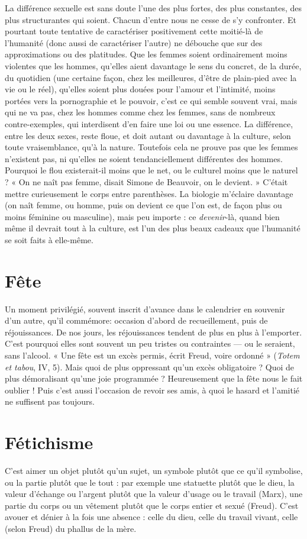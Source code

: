 La différence sexuelle est sans doute l’une des plus fortes, des plus constantes,
des plus structurantes qui soient. Chacun d’entre nous ne cesse de s’y
confronter. Et pourtant toute tentative de caractériser positivement cette
moitié-là de l’humanité (donc aussi de caractériser l’autre) ne débouche que sur
des approximations ou des platitudes. Que les femmes soient ordinairement
moins violentes que les hommes, qu’elles aient davantage le sens du concret, de
la durée, du quotidien (une certaine façon, chez les meilleures, d’être de plain-pied
avec la vie ou le réel), qu’elles soient plus douées pour l’amour et l’intimité,
moins portées vers la pornographie et le pouvoir, c’est ce qui semble souvent
vrai, mais qui ne va pas, chez les hommes comme chez les femmes, sans de
nombreux contre-exemples, qui interdisent d’en faire une loi ou une essence.
La différence, entre les deux sexes, reste floue, et doit autant ou davantage à la
culture, selon toute vraisemblance, qu’à la nature. Toutefois cela ne prouve pas
que les femmes n’existent pas, ni qu’elles ne soient tendanciellement différentes
des hommes. Pourquoi le flou existerait-il moins que le net, ou le culturel
moins que le naturel ? « On ne naît pas femme, disait Simone de Beauvoir, on
le devient. » C’était mettre curieusement le corps entre parenthèses. La biologie
m'éclaire davantage (on naît femme, ou homme, puis on devient ce que l’on
est, de façon plus ou moins féminine ou masculine), mais peu importe : ce
{\it devenir}-là, quand bien même il devrait tout à la culture, est l’un des plus beaux
cadeaux que l'humanité se soit faits à elle-même.

\section{Fête}
Un moment privilégié, souvent inscrit d’avance dans le calendrier en
souvenir d’un autre, qu’il commémore: occasion d’abord de
recueillement, puis de réjouissances. De nos jours, les réjouissances tendent de
plus en plus à l’emporter. C’est pourquoi elles sont souvent un peu tristes ou
contraintes — ou le seraient, sans l'alcool. « Une fête est un excès permis, écrit
Freud, voire ordonné » ({\it Totem et tabou}, IV, 5). Mais quoi de plus oppressant
qu’un excès obligatoire ? Quoi de plus démoralisant qu’une joie programmée ?
Heureusement que la fête nous le fait oublier ! Puis c’est aussi l’occasion de
revoir ses amis, à quoi le hasard et l’amitié ne suffisent pas toujours.

\section{Fétichisme}
C’est aimer un objet plutôt qu’un sujet, un symbole plutôt
que ce qu’il symbolise, ou la partie plutôt que le tout : par
exemple une statuette plutôt que le dieu, la valeur d'échange ou l'argent plutôt
que la valeur d’usage ou le travail (Marx), une partie du corps ou un vêtement
plutôt que le corps entier et sexué (Freud). C’est avouer et dénier à la fois une
absence : celle du dieu, celle du travail vivant, celle (selon Freud) du phallus de
la mère.

